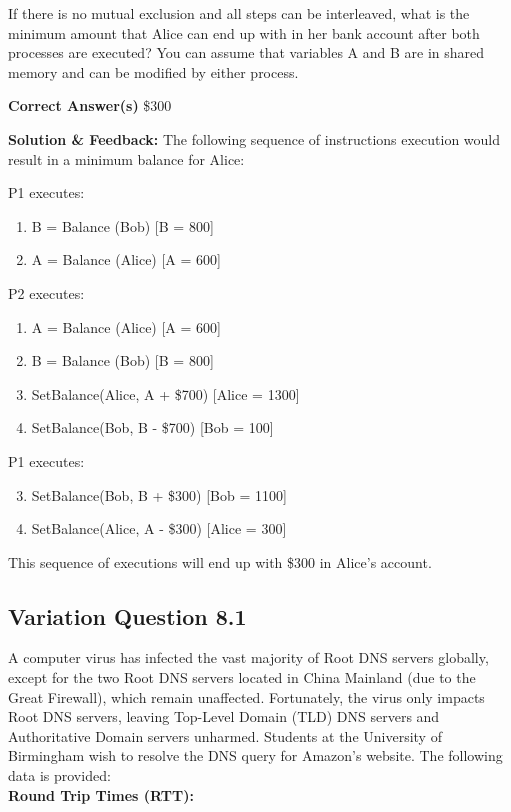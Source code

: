 If there is no mutual exclusion and all steps can be interleaved, what is the minimum amount that Alice can end up with in her bank account after both processes are executed? You can assume that variables A and B are in shared memory and can be modified by either process.

\textbf{Correct Answer(s)}
\$300

\textbf{Solution \& Feedback:}
The following sequence of instructions execution would result in a minimum balance for Alice:

P1 executes:
\begin{enumerate}
    \item B = Balance (Bob) [B = 800]
    \item A = Balance (Alice) [A = 600]
\end{enumerate}
P2 executes:
\begin{enumerate}
    \item A = Balance (Alice) [A = 600]
    \item B = Balance (Bob) [B = 800]
    \item SetBalance(Alice, A + \$700) [Alice = 1300]
    \item SetBalance(Bob, B - \$700) [Bob = 100]
\end{enumerate}
P1 executes:
\begin{enumerate}
    \setcounter{enumi}{2}
    \item SetBalance(Bob, B + \$300) [Bob = 1100]
    \item SetBalance(Alice, A - \$300) [Alice = 300]
\end{enumerate}
This sequence of executions will end up with \$300 in Alice’s account.

\subsection{Variation Question 8.1}

A computer virus has infected the vast majority of Root DNS servers 
globally, except for the two Root DNS servers located in China Mainland
(due to the Great Firewall), which remain unaffected. Fortunately, the 
virus only impacts Root DNS servers, leaving Top-Level Domain (TLD) 
DNS servers and Authoritative Domain servers unharmed. Students at the 
University of Birmingham wish to resolve the DNS query for Amazon's 
website. The following data is provided:\\

\textbf{Round Trip Times (RTT):}\\

